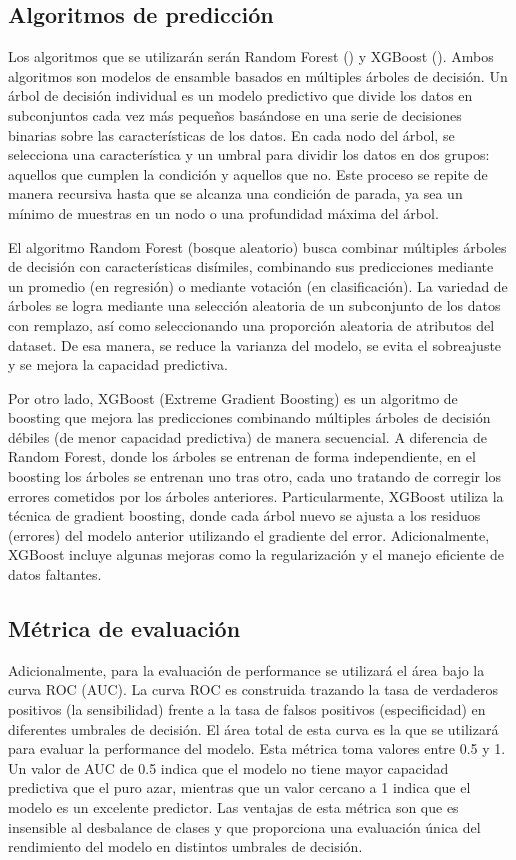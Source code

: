 \documentclass{article}
\begin{document}
\subsection{Algoritmos de predicción}
Los algoritmos que se utilizarán serán Random Forest (\cite{Bre01}) y XGBoost
(\cite{Che16}). Ambos algoritmos son modelos de ensamble basados en múltiples 
árboles de decisión. Un árbol de decisión individual es un modelo predictivo que divide 
los datos en subconjuntos cada vez más pequeños basándose en una serie de decisiones 
binarias sobre las características de los datos. En cada nodo del árbol, se selecciona una 
característica y un umbral para dividir los datos en dos grupos: aquellos que cumplen 
la condición y aquellos que no. Este proceso se repite de manera recursiva hasta que se 
alcanza una condición de parada, ya sea un mínimo de muestras en un nodo o una 
profundidad máxima del árbol.

El algoritmo Random Forest (bosque aleatorio) busca combinar 
múltiples árboles de decisión con características disímiles, combinando sus predicciones
mediante un promedio (en regresión) o mediante votación (en clasificación). 
La variedad de árboles se logra mediante una selección aleatoria de un subconjunto de los 
datos con remplazo, así como seleccionando una proporción aleatoria
de atributos del dataset. De esa manera, se reduce la varianza del modelo, se evita el
sobreajuste y se mejora la capacidad predictiva.

Por otro lado, XGBoost (Extreme Gradient Boosting) es un algoritmo de boosting que mejora 
las predicciones combinando múltiples árboles de decisión débiles (de menor capacidad 
predictiva) de manera secuencial. A diferencia de Random Forest, donde los árboles se 
entrenan de  forma independiente, en el boosting los árboles se entrenan uno tras otro, 
cada uno tratando de corregir los errores cometidos por los árboles anteriores. 
Particularmente, XGBoost utiliza la técnica de gradient boosting, donde cada árbol nuevo 
se ajusta a los residuos (errores) del modelo anterior utilizando el gradiente del error. 
Adicionalmente, XGBoost incluye algunas mejoras como la regularización
y el manejo eficiente de datos faltantes. 

\subsection{Métrica de evaluación}
Adicionalmente, para la evaluación de performance se utilizará el área bajo la curva ROC 
(AUC). La curva ROC es construida trazando la tasa de verdaderos positivos (la 
sensibilidad) frente a la tasa de falsos positivos (especificidad) en diferentes umbrales 
de decisión. El área total de esta curva es la que se utilizará para evaluar la 
performance del modelo. Esta métrica toma valores entre 0.5 y 1. Un valor de AUC de 0.5 
indica que el modelo no tiene mayor capacidad predictiva que el puro azar, mientras que un 
valor cercano a 1 indica que el modelo es un excelente predictor. Las ventajas de 
esta métrica son que es insensible al desbalance de clases y que proporciona una evaluación
única del rendimiento del modelo en distintos umbrales de decisión.
\end{document}
